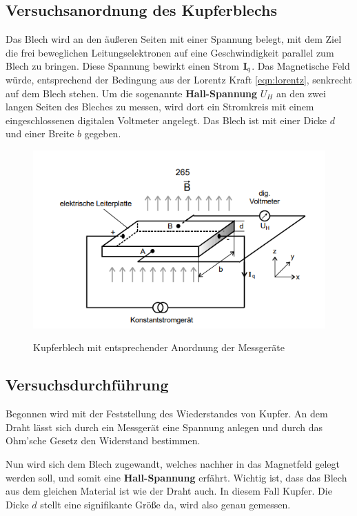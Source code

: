 \subsection{Versuchsanordnung des Kupferblechs}
\label{sec:Blech}
Das Blech wird an den äußeren Seiten mit einer Spannung belegt, mit dem Ziel die frei beweglichen Leitungselektronen auf eine Geschwindigkeit parallel zum 
Blech zu bringen. Diese Spannung bewirkt einen Strom $\text{\textbf{I}}_q$. Das Magnetische Feld würde, entsprechend der Bedingung aus der Lorentz Kraft \eqref{eqn:lorentz},
senkrecht auf dem Blech stehen. Um die sogenannte \textbf{Hall-Spannung} $U_H$ an den zwei langen Seiten des Bleches zu messen, wird dort ein Stromkreis
mit einem eingeschlossenen digitalen Voltmeter angelegt. Das Blech ist mit einer Dicke $d$ und einer Breite $b$ gegeben.

\begin{figure}
     \centering
     \includegraphics[width=\textwidth]{bilder/versuchsanordnung.png}
     \caption{Kupferblech mit entsprechender Anordnung der Messgeräte}
     \cite[9]{V311.pdf}
     \label{fig:kupferblech}
\end{figure}

\subsection{Versuchsdurchführung}
Begonnen wird mit der Feststellung des Wiederstandes von Kupfer. An dem Draht lässt sich durch ein Messgerät eine Spannung anlegen und durch das Ohm'sche Gesetz
den Widerstand bestimmen. \\ \flushleft

Nun wird sich dem Blech zugewandt, welches nachher in das Magnetfeld gelegt werden soll, und somit eine \textbf{Hall-Spannung} erfährt.
Wichtig ist, dass das Blech aus dem gleichen Material ist wie der Draht auch. In diesem Fall Kupfer. Die Dicke $d$ stellt eine signifikante Größe da, wird also genau gemessen.\\ \flushleft


